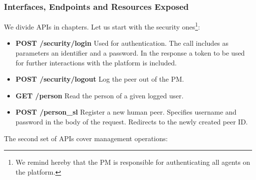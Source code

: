\subsubsection{Interfaces, Endpoints and Resources Exposed}
We divide APIs in chapters. Let us start with the security ones\footnote{We remind hereby that the PM is responsible for authenticating all agents on the platform.}:
\begin{itemize}
\item {\bf POST /security/login} Used for authentication. The call includes as parameters an identifier and a password. In the response a token to be used for further interactions with the platform is included.
\item {\bf POST /security/logout} Log the peer out of the PM.
\item {\bf GET /person} Read the person of a given logged user. 
\item {\bf POST /person\_sl} Register a new human peer. Specifies username and password in the body of the request. Redirects to the newly created peer ID.  %
\end{itemize}
The second set of APIs cover management operations:
